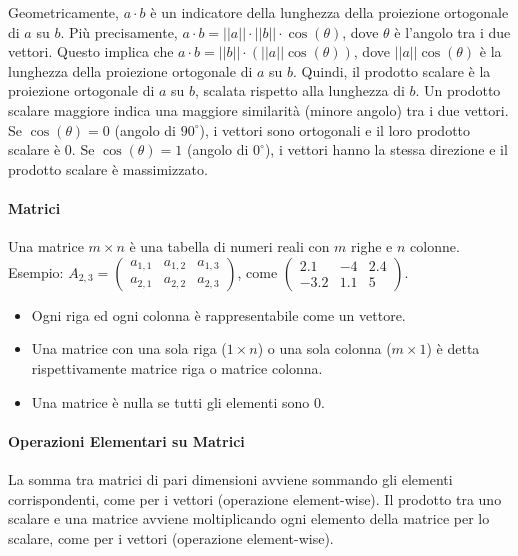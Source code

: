 \documentclass{article}
\begin{document}
Geometricamente, $a \cdot b$ è un indicatore della lunghezza della proiezione ortogonale di $a$ su $b$.
Più precisamente, $a \cdot b = ||a|| \cdot ||b|| \cdot \cos(\theta)$, dove $\theta$ è l'angolo tra i due vettori. Questo implica che $a \cdot b = ||b|| \cdot (||a|| \cos(\theta))$, dove $||a|| \cos(\theta)$ è la lunghezza della proiezione ortogonale di $a$ su $b$.
Quindi, il prodotto scalare è la proiezione ortogonale di $a$ su $b$, scalata rispetto alla lunghezza di $b$.
Un prodotto scalare maggiore indica una maggiore similarità (minore angolo) tra i due vettori. Se $\cos(\theta) = 0$ (angolo di $90^\circ$), i vettori sono ortogonali e il loro prodotto scalare è 0. Se $\cos(\theta) = 1$ (angolo di $0^\circ$), i vettori hanno la stessa direzione e il prodotto scalare è massimizzato.

\paragraph{Matrici} Una matrice $m \times n$ è una tabella di numeri reali con $m$ righe e $n$ colonne.
Esempio: $A_{2,3} = \begin{pmatrix} a_{1,1} & a_{1,2} & a_{1,3} \\ a_{2,1} & a_{2,2} & a_{2,3} \end{pmatrix}$, come $\begin{pmatrix} 2.1 & -4 & 2.4 \\ -3.2 & 1.1 & 5 \end{pmatrix}$.
\begin{itemize}
    \item Ogni riga ed ogni colonna è rappresentabile come un vettore.
    \item Una matrice con una sola riga ($1 \times n$) o una sola colonna ($m \times 1$) è detta rispettivamente matrice riga o matrice colonna.
    \item Una matrice è nulla se tutti gli elementi sono 0.
\end{itemize}

\paragraph{Operazioni Elementari su Matrici} La somma tra matrici di pari dimensioni avviene sommando gli elementi corrispondenti, come per i vettori (operazione element-wise).
Il prodotto tra uno scalare e una matrice avviene moltiplicando ogni elemento della matrice per lo scalare, come per i vettori (operazione element-wise).
\end{document}
